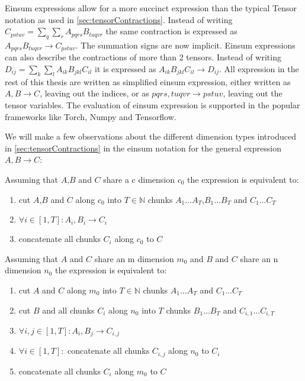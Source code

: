 Einsum expressions allow for a more succinct expression than the typical Tensor notation as used in \ref{sec:tensorContractions}.
Instead of writing $C_{pstuv}=\sum_{q}\sum_{r}A_{pqrs}B_{tuqvr}$ the same contraction is expressed as $A_{pqrs}B_{tuqvr} \rightarrow C_{pstuv}$.
The summation signs are now implicit.
Einsum expressions can also describe the contractions of more than 2 tensors\cite{einsum_is_all_you_need}.
Instead of writing $D_{ij} = \sum_{k}\sum_{l}A_{ik}B_{jkl}C_{il}$ it is expressed as $A_{ik}B_{jkl}C_{il} \rightarrow D_{ij}$.
All expression in the rest of this thesis are written as simplified einsum expression, either written as $A,B\rightarrow C$, leaving out the indices, or as $pqrs,tuqvr \rightarrow pstuv$, leaving out the tensor variables.
The evaluation of einsum expression is supported in the popular frameworks like Torch\cite{torch}, Numpy\cite{numpy} and Tensorflow\cite{tensorflow}.

We will make a few observations about the different dimension types introduced in \ref{sec:tensorContractions} in the einsum notation for the general expression $A,B \rightarrow C$:

Assuming that $A$,$B$ and $C$ share a c dimension $c_0$ the expression is equivalent to:
\begin{enumerate}
  \item cut $A$,$B$ and $C$ along $c_0$ into $T \in \mathbb{N}$ chunks $A_1 \dots A_T$,$B_1 \dots B_T$ and $C_1 \dots C_T$
  \item $\forall i \in [1,T]: A_i, B_i \rightarrow C_i$
  \item concatenate all chunks $C_i$ along $c_0$ to $C$
\end{enumerate}

Assuming that $A$ and $C$ share an m dimension $m_0$ and $B$ and $C$ share an n dimension $n_0$ the expression is equivalent to:
\begin{enumerate}
  \item cut $A$ and $C$ along $m_0$ into $T \in \mathbb{N}$ chunks $A_1 \dots A_T$ and $C_1 \dots C_T$
  \item cut $B$ and all chunks $C_i$ along $n_0$ into $T$ chunks $B_1 \dots B_T$ and $C_{i,1} \dots C_{i,T}$
  \item $\forall i,j \in [1,T]: A_i, B_j \rightarrow C_{i,j}$
  \item $\forall i \in [1,T]:$ concatenate all chunks $C_{i,j}$ along $n_0$ to $C_i$
  \item concatenate all chunks $C_i$ along $m_0$ to $C$
\end{enumerate}

